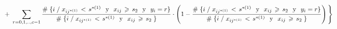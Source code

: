 \documentclass[
  11pt,
  a4paper,
]{article}
\begin{document}
\begin{gather*}
\hspace{-1.5 cm} +  \hspace{0.1cm}         \sum_{r=0,1,..,c-1}^{}  \dfrac{\# \hspace{0.1 cm}\lbrace i \hspace{0.1 cm}/\hspace{0.1 cm}  x_{ij^{*(1)}} \hspace{0.05cm}   < \hspace{0.05cm} s^{*(1)} \hspace{0.25 cm}\text{y}\hspace{0.25 cm} x_{ij} \hspace{0.05cm}   \geqslant \hspace{0.05cm} s_2 \hspace{0.25 cm}\text{y}\hspace{0.25 cm} y_i = r \rbrace}{\# \hspace{0.1 cm}\lbrace i \hspace{0.1 cm} / \hspace{0.1 cm}  x_{ij^{*(1)}} \hspace{0.05cm}   < \hspace{0.05cm} s^{*(1)} \hspace{0.25 cm}\text{y}\hspace{0.25 cm} x_{ij} \hspace{0.05cm}   \geqslant \hspace{0.05cm} s_2  \hspace{0.1 cm} \rbrace }  \cdot \left(   1 - \dfrac{\# \hspace{0.1 cm}\lbrace i \hspace{0.1 cm}/\hspace{0.1 cm}  x_{ij^{*(1)}} \hspace{0.05cm}   < \hspace{0.05cm} s^{*(1)} \hspace{0.25 cm}\text{y}\hspace{0.25 cm} x_{ij} \hspace{0.05cm}   \geqslant \hspace{0.05cm} s_2 \hspace{0.25 cm}\text{y}\hspace{0.25 cm} y_i = r \rbrace}{\# \hspace{0.1 cm}\lbrace i \hspace{0.1 cm} / \hspace{0.1 cm}  x_{ij^{*(1)}} \hspace{0.05cm}   < \hspace{0.05cm} s^{*(1)} \hspace{0.25 cm}\text{y}\hspace{0.25 cm} x_{ij} \hspace{0.05cm}   \geqslant \hspace{0.05cm} s_2  \hspace{0.1 cm} \rbrace }  \right)    \Biggl\} \\ \\

\end{gather*}
\end{document}
